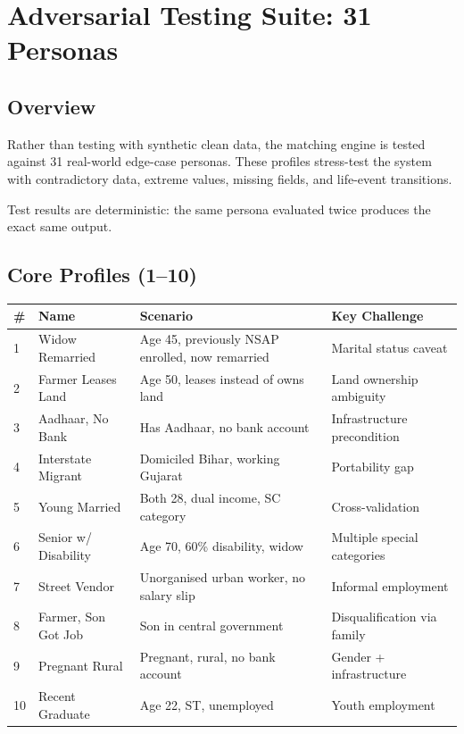 \documentclass[11pt,a4paper]{report}
\begin{document}
\chapter{Adversarial Testing Suite: 31 Personas}

\section{Overview}

Rather than testing with synthetic clean data, the matching engine is tested against 31 real-world edge-case personas. These profiles stress-test the system with contradictory data, extreme values, missing fields, and life-event transitions.

Test results are deterministic: the same persona evaluated twice produces the exact same output.

\section{Core Profiles (1--10)}

\begin{table}[H]
\centering
\small
\begin{tabular}{p{0.7cm}p{2.5cm}p{5cm}p{1.8cm}}
\toprule
\# & Name & Scenario & Key Challenge \\
\midrule
1 & Widow Remarried & Age 45, previously NSAP enrolled, now remarried & Marital status caveat \\
2 & Farmer Leases Land & Age 50, leases instead of owns land & Land ownership ambiguity \\
3 & Aadhaar, No Bank & Has Aadhaar, no bank account & Infrastructure precondition \\
4 & Interstate Migrant & Domiciled Bihar, working Gujarat & Portability gap \\
5 & Young Married & Both 28, dual income, SC category & Cross-validation \\
6 & Senior w/ Disability & Age 70, 60\% disability, widow & Multiple special categories \\
7 & Street Vendor & Unorganised urban worker, no salary slip & Informal employment \\
8 & Farmer, Son Got Job & Son in central government & Disqualification via family \\
9 & Pregnant Rural & Pregnant, rural, no bank account & Gender + infrastructure \\
10 & Recent Graduate & Age 22, ST, unemployed & Youth employment \\
\bottomrule
\end{tabular}
\end{table}
\end{document}
